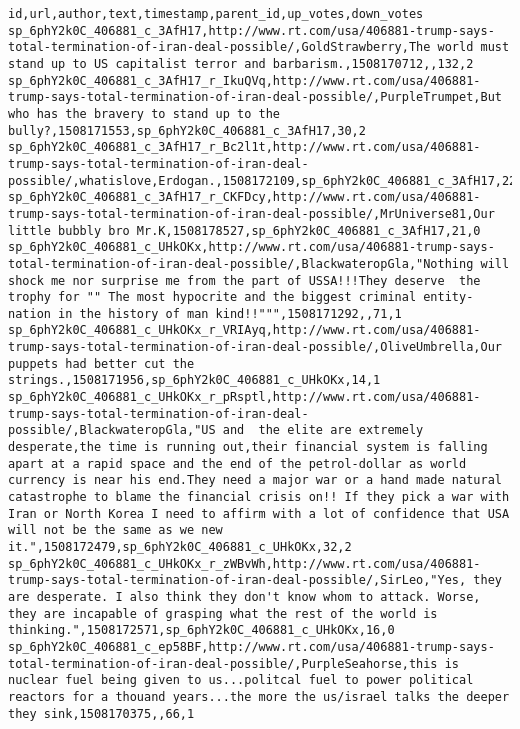 \documentclass{scrartcl}
\begin{document}
\begin{lstlisting}
id,url,author,text,timestamp,parent_id,up_votes,down_votes
sp_6phY2k0C_406881_c_3AfH17,http://www.rt.com/usa/406881-trump-says-total-termination-of-iran-deal-possible/,GoldStrawberry,The world must stand up to US capitalist terror and barbarism.,1508170712,,132,2
sp_6phY2k0C_406881_c_3AfH17_r_IkuQVq,http://www.rt.com/usa/406881-trump-says-total-termination-of-iran-deal-possible/,PurpleTrumpet,But who has the bravery to stand up to the bully?,1508171553,sp_6phY2k0C_406881_c_3AfH17,30,2
sp_6phY2k0C_406881_c_3AfH17_r_Bc2l1t,http://www.rt.com/usa/406881-trump-says-total-termination-of-iran-deal-possible/,whatislove,Erdogan.,1508172109,sp_6phY2k0C_406881_c_3AfH17,22,6
sp_6phY2k0C_406881_c_3AfH17_r_CKFDcy,http://www.rt.com/usa/406881-trump-says-total-termination-of-iran-deal-possible/,MrUniverse81,Our little bubbly bro Mr.K,1508178527,sp_6phY2k0C_406881_c_3AfH17,21,0
sp_6phY2k0C_406881_c_UHkOKx,http://www.rt.com/usa/406881-trump-says-total-termination-of-iran-deal-possible/,BlackwateropGla,"Nothing will  shock me nor surprise me from the part of USSA!!!They deserve  the trophy for "" The most hypocrite and the biggest criminal entity-nation in the history of man kind!!""",1508171292,,71,1
sp_6phY2k0C_406881_c_UHkOKx_r_VRIAyq,http://www.rt.com/usa/406881-trump-says-total-termination-of-iran-deal-possible/,OliveUmbrella,Our puppets had better cut the strings.,1508171956,sp_6phY2k0C_406881_c_UHkOKx,14,1
sp_6phY2k0C_406881_c_UHkOKx_r_pRsptl,http://www.rt.com/usa/406881-trump-says-total-termination-of-iran-deal-possible/,BlackwateropGla,"US and  the elite are extremely desperate,the time is running out,their financial system is falling apart at a rapid space and the end of the petrol-dollar as world currency is near his end.They need a major war or a hand made natural catastrophe to blame the financial crisis on!! If they pick a war with Iran or North Korea I need to affirm with a lot of confidence that USA will not be the same as we new it.",1508172479,sp_6phY2k0C_406881_c_UHkOKx,32,2
sp_6phY2k0C_406881_c_UHkOKx_r_zWBvWh,http://www.rt.com/usa/406881-trump-says-total-termination-of-iran-deal-possible/,SirLeo,"Yes, they are desperate. I also think they don't know whom to attack. Worse, they are incapable of grasping what the rest of the world is thinking.",1508172571,sp_6phY2k0C_406881_c_UHkOKx,16,0
sp_6phY2k0C_406881_c_ep58BF,http://www.rt.com/usa/406881-trump-says-total-termination-of-iran-deal-possible/,PurpleSeahorse,this is nuclear fuel being given to us...politcal fuel to power political reactors for a thouand years...the more the us/israel talks the deeper they sink,1508170375,,66,1

\end{lstlisting}
\end{document}
